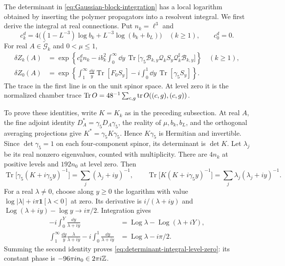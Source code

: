 The determinant in \eqref{eq:Gaussian-block-integration} has a local
logarithm obtained by inserting the polymer propagators into a
resolvent integral. We first derive the integral at real connections.
Put $n_k=\ell^3$ and
\[
 c_k^d=4\bigl((1-L^{-3})\log b_k+L^{-3}\log(b_k+b_L)\bigr)
       \quad(k\ge1),\qquad c_0^d=0.
\]
For real $A\in\widetilde{\mathcal G}_k$ and $0<\mu\le1$,
\begin{align}
 \delta Z_k(A)
  &=\exp\left\{c_k^dn_k-ib_k^2\int_0^\infty\dd y\,
       \operatorname{Tr}\bigl[\gamma_5\mathcal B_{k,y}
          \mathcal Q_kS_y\mathcal Q_k^\sharp\mathcal B_{k,y}\bigr]
                        \right\}\quad(k\ge1),
                                    \label{eq:determinant-integral-positive-level}\\
 \delta Z_0(A)
  &=\exp\left\{\int_1^\infty\frac{\dd y}{y}
                       \operatorname{Tr}[F_0S_y]
             -i\int_0^1\dd y\,\operatorname{Tr}[\gamma_5S_y]
                        \right\}.\label{eq:determinant-integral-level-zero}
\end{align}
The trace in the first line is on the unit spinor space. At level
zero it is the normalized chamber trace
$\operatorname{Tr}O=48^{-1}\sum_{c,g}\operatorname{tr} O((c,g),(c,g))$.

To prove these identities, write $K=K_k$ as in the preceding
subsection. At real $A$, the fine adjoint identity
$D_A^*=\gamma_5D_A\gamma_5$, the reality of $\mu,b_k,b_L$, and
the orthogonal averaging projections give
$K^*=\gamma_5K\gamma_5$. Hence $K\gamma_5$ is Hermitian and
invertible. Since $\det\gamma_5=1$ on each four-component spinor,
its determinant is $\det K$. Let $\lambda_j$ be its real nonzero
eigenvalues, counted with multiplicity. There are $4n_k$ at positive
levels and $192n_0$ at level zero. Then
\[
 \operatorname{Tr}\bigl[\gamma_5(K+i\gamma_5y)^{-1}\bigr]
        =\sum_j(\lambda_j+iy)^{-1},\qquad
 \operatorname{Tr}\bigl[K(K+i\gamma_5y)^{-1}\bigr]
        =\sum_j\lambda_j(\lambda_j+iy)^{-1}.
\]
For a real $\lambda\ne0$, choose along $y\ge0$ the logarithm
with value $\log|\lambda|+i\pi\mathbf1[\lambda<0]$ at zero.
Its derivative is $i/(\lambda+iy)$ and
$\operatorname{Log}(\lambda+iy)-\log y\to i\pi/2$.
Integration gives
\begin{align*}
 -i\int_0^Y\frac{\dd y}{\lambda+iy}
        &=\operatorname{Log}\lambda-
                          \operatorname{Log}(\lambda+iY),\\
 \int_1^\infty\frac{\dd y}{y}\frac{\lambda}{\lambda+iy}
       -i\int_0^1\frac{\dd y}{\lambda+iy}
        &=\operatorname{Log}\lambda-i\pi/2.
\end{align*}
Summing the second identity proves
\eqref{eq:determinant-integral-level-zero}: its constant phase is
$-96\pi i n_0\in2\pi i\mathbb Z$.

